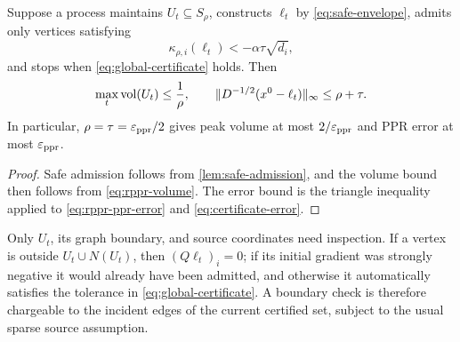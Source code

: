\begin{corollary}
\label{cor:accuracy-volume}
Suppose a process maintains $U_t\subseteq S_\rho$, constructs $\ell_t$ by
\cref{eq:safe-envelope}, admits only vertices satisfying
\begin{equation}
  \kappa_{\rho,i}(\ell_t)<-\alpha\tau\sqrt{d_i},
  \label{eq:strong-admission}
\end{equation}
and stops when \cref{eq:global-certificate} holds.  Then
\begin{equation}
  \max_t\operatorname{vol}(U_t)\leq\frac1\rho,
  \qquad
  \lVert D^{-1/2}(x^0-\ell_t)\rVert_\infty\leq\rho+\tau.
  \label{eq:gate-main-bound}
\end{equation}
In particular, $\rho=\tau=\varepsilon_{\mathrm{ppr}}/2$ gives peak volume at most
$2/\varepsilon_{\mathrm{ppr}}$ and PPR error at most $\varepsilon_{\mathrm{ppr}}$.
\end{corollary}

\begin{proof}
Safe admission follows from \cref{lem:safe-admission}, and the volume bound
then follows from \cref{eq:rppr-volume}.  The error bound is the triangle
inequality applied to \cref{eq:rppr-ppr-error} and
\cref{eq:certificate-error}.
\end{proof}

Only $U_t$, its graph boundary, and source coordinates need inspection.  If a
vertex is outside $U_t\cup N(U_t)$, then $(Q\ell_t)_i=0$; if its initial
gradient was strongly negative it would already have been admitted, and
otherwise it automatically satisfies the tolerance in
\cref{eq:global-certificate}.  A boundary check is therefore chargeable to
the incident edges of the current certified set, subject to the usual sparse
source assumption.
